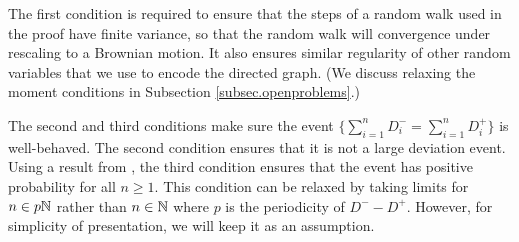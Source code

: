 The first condition is required to ensure that the steps of a random walk used in the proof have finite variance, so that the random walk will convergence under rescaling to a Brownian motion. It also ensures similar regularity of other random variables that we use to encode the directed graph. (We discuss relaxing the moment conditions in Subsection \ref{subsec.openproblems}.)

The second and third conditions make sure the event $\{\sum_{i=1}^n D^-_i = \sum_{i=1}^n D^+_i\}$ is well-behaved. The second condition ensures that it is not a large deviation event. Using a result from \citet[Page 42, P1]{spitzerPrinciplesRandomWalk1964}, the third condition ensures that the event has positive probability for all $n \geq 1$. This condition can be relaxed by taking limits for $n \in p {\mathbb N}$ rather than $n \in {\mathbb N}$ where $p$ is the periodicity of $D^- - D^+$. However, for simplicity of presentation, we will keep it as an assumption.

